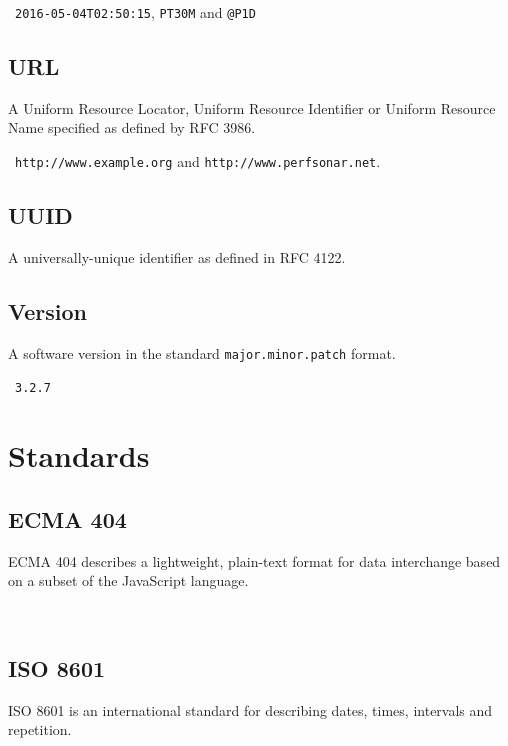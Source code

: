 \documentclass[10pt]{article}
\begin{document}
\example\ {\tt 2016-05-04T02:50:15}, {\tt PT30M} and {\tt @P1D}



\subsection{URL}
A Uniform Resource Locator, Uniform Resource Identifier or Uniform
Resource Name specified as defined by RFC 3986.

\example\ {\tt http://www.example.org} and {\tt http://www.perfsonar.net}.



\subsection{UUID}
A universally-unique identifier as defined in RFC 4122.



\subsection{Version}
A software version in the standard {\tt major.minor.patch} format.

\example\ {\tt 3.2.7}




%
%

\section{Standards}\label{standards}

\subsection{ECMA 404}
ECMA 404 describes a lightweight, plain-text format for data
interchange based on a subset of the JavaScript language.

\\


\subsection{ISO 8601}
ISO 8601 is an international standard for describing dates, times,
intervals and repetition.

\\
\end{document}
